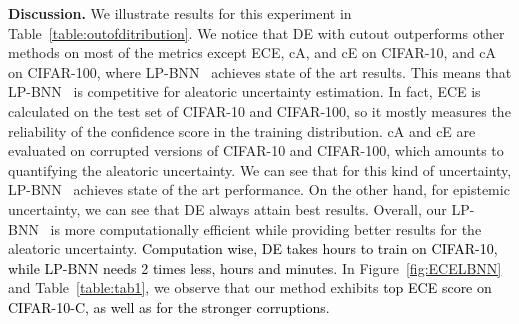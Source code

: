 \documentclass[10pt,twocolumn,letterpaper]{article}
\newcommand{\ab}[1]{\textcolor{black}{#1}}
\newcommand{\method}{LP-BNN\xspace}
\begin{document}
\noindent\textbf{Discussion.} We illustrate results for this experiment in Table~\ref{table:outofditribution}. We notice that DE with cutout outperforms other methods on most of the metrics except ECE, cA, and cE on CIFAR-10, and cA on CIFAR-100, where \method~ achieves state of the art results. This means that \method~ is competitive for aleatoric uncertainty estimation. In fact, ECE is calculated on the test set of CIFAR-10 and CIFAR-100, so it mostly measures the reliability of the confidence score in the training distribution. cA and cE are evaluated on corrupted versions of CIFAR-10 and CIFAR-100, which amounts to quantifying the aleatoric uncertainty. We can see that for this kind of uncertainty, \method~ achieves state of the art performance.
 On the other hand, for epistemic uncertainty, we can see that DE always attain best results. Overall, our \method~ is more computationally efficient 
while providing better results for the aleatoric uncertainty.  
\ab{Computation wise, DE takes  hours to train on CIFAR-10, while \method needs 2 times less,  hours and  minutes.}
In Figure~\ref{fig:ECELBNN} and Table~\ref{table:tab1}, we observe that our method exhibits 
\ab{top ECE score on CIFAR-10-C, as well as for the stronger corruptions.}












    
\end{document}
